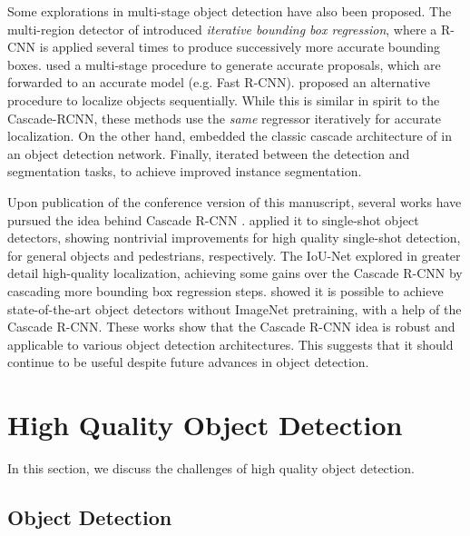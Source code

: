 \documentclass[10pt,journal,compsoc]{IEEEtran}
\begin{document}
Some explorations in multi-stage object detection have also been proposed.
The multi-region detector of \cite{DBLP:conf/iccv/GidarisK15}
introduced \textit{iterative bounding box regression}, where a
R-CNN is applied several times to produce successively more accurate
bounding boxes. \cite{DBLP:conf/cvpr/YangYLL16,DBLP:conf/cvpr/GidarisK16,DBLP:conf/bmvc/GidarisK16} used a multi-stage procedure
to generate accurate proposals, which are forwarded to an accurate model
(e.g. Fast R-CNN). \cite{DBLP:conf/iccv/YooPLPK15,DBLP:conf/cvpr/NajibiRD16}
proposed an alternative procedure to localize objects sequentially. While
this is similar in spirit to the Cascade-RCNN, these
methods use the {\it same\/} regressor iteratively for accurate localization.
On the other hand,
\cite{DBLP:conf/cvpr/LiLSBH15,DBLP:journals/corr/OuyangWZW17}
embedded the classic cascade architecture of
\cite{DBLP:journals/ijcv/ViolaJ04} in an object detection network.
Finally, \cite{DBLP:conf/cvpr/DaiHS16} iterated between the
detection and segmentation tasks, to achieve improved instance
segmentation.

Upon publication of the conference version of this manuscript,
several works have pursued the idea behind Cascade R-CNN
\cite{DBLP:conf/eccv/JiangLMXJ18,DBLP:conf/eccv/LiuLHLC18,DBLP:journals/corr/abs-1803-08208,DBLP:journals/corr/abs-1901-07518}. \cite{DBLP:conf/eccv/LiuLHLC18,DBLP:journals/corr/abs-1803-08208} applied it to
single-shot object detectors, showing nontrivial improvements
for high quality single-shot detection, for general objects and
pedestrians, respectively. The IoU-Net \cite{DBLP:conf/eccv/JiangLMXJ18} explored
in greater detail high-quality localization,
achieving some gains over the Cascade R-CNN by cascading more bounding box
regression steps. \cite{he2018rethinking} showed it is possible to achieve state-of-the-art object detectors without ImageNet pretraining, with a help of the Cascade R-CNN. These works show that the Cascade R-CNN idea is robust
and applicable to various object detection architectures.
This suggests that it should continue to be useful despite future advances
in object detection.


\section{High Quality Object Detection}

In this section, we discuss the challenges of high quality
object detection.

\subsection{Object Detection}
\end{document}
